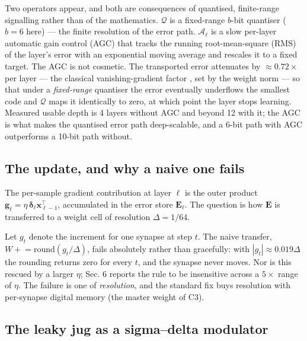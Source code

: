 \documentclass[11pt]{article}
\begin{document}
Two operators appear, and both are consequences of quantised,
finite-range signalling rather than of the mathematics. \(\mathcal{Q}\)
is a fixed-range \(b\)-bit quantiser (\(b = 6\) here) --- the finite
resolution of the error path. \(\mathcal{A}_\ell\) is a slow per-layer
automatic gain control (AGC) that tracks the running root-mean-square
(RMS) of the layer's error with an exponential moving average and
rescales it to a fixed target. The AGC is not cosmetic. The transported
error attenuates by \(\approx 0.72\times\) per layer --- the classical
vanishing-gradient factor \cite{bengio1994learning}, set by the weight
norm --- so that under a \emph{fixed-range} quantiser the error
eventually underflows the smallest code and \(\mathcal{Q}\) maps it
identically to zero, at which point the layer stops learning. Measured
usable depth is 4 layers without AGC and beyond 12 with it; the AGC is
what makes the quantised error path deep-scalable, and a 6-bit path with
AGC outperforms a 10-bit path without.

\hypertarget{the-update-and-why-a-naive-one-fails}{%
\subsection{The update, and why a naive one
fails}\label{the-update-and-why-a-naive-one-fails}}

The per-sample gradient contribution at layer \(\ell\) is the outer
product \(\bm g_\ell = \eta\, \bm\delta_\ell \bm x_{\ell-1}^{\!\top}\),
accumulated in the error store \(\bm E_\ell\). The question is how
\(\bm E\) is transferred to a weight cell of resolution
\(\Delta = 1/64\).

Let \(g_t\) denote the increment for one synapse at step \(t\). The
naive transfer, \(W \mathrel{+}= \mathrm{round}(g_t/\Delta)\), fails
absolutely rather than gracefully: with \(|g_t| \approx 0.019\Delta\)
the rounding returns zero for every \(t\), and the synapse never moves.
Nor is this rescued by a larger \(\eta\); Sec. 6 reports the rule to be
insensitive across a \(5\times\) range of \(\eta\). The failure is one
of \emph{resolution}, and the standard fix buys resolution with
per-synapse digital memory (the master weight of C3).

\hypertarget{sec:jug}{%
\subsection{The leaky jug as a sigma--delta modulator}\label{sec:jug}}
\end{document}
